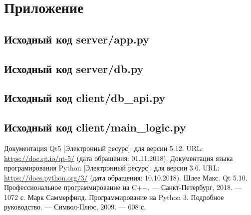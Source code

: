 \documentclass[14pt, a4paper]{extarticle}
\begin{document}
    \newpage
    \section{Приложение}
    \subsection{Исходный код server/app.py}
    


    \newpage
    \subsection{Исходный код server/db.py}
    




    \newpage
    \subsection{Исходный код client/db\_api.py}
    


    \newpage
    \subsection{Исходный код client/main\_logic.py}
    


    \newpage
    \begin{thebibliography}{}
        \bibitem{}
        Документация Qt5 [Электронный ресурс]: для версии 5.12. URL: \url{https://doc.qt.io/qt-5/} (дата обращения: 01.11.2018).
        \bibitem{}
        Документация языка програмирования Python [Электронный ресурс]: для версии 3.6. URL: \url{https://docs.python.org/3/} (дата обращения: 10.10.2018).
        \bibitem{}
        Шлее Макс. Qt 5.10. Профессиональное программирование на C++. --- Санкт-Петербург, 2018. --- 1072 с.
        \bibitem{}
        Марк Саммерфилд. Программирование на Python 3. Подробное руководство. --- Символ-Плюс, 2009. --- 608 с.
    \end{thebibliography}
\end{document}
